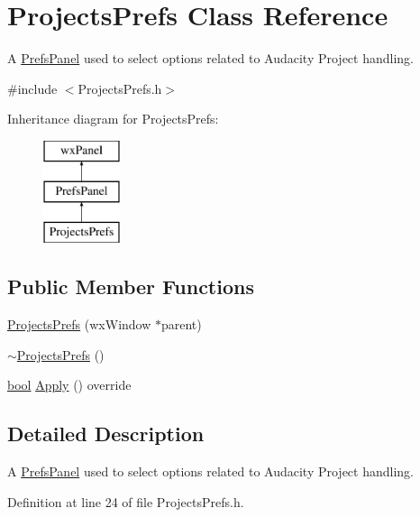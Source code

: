 \hypertarget{class_projects_prefs}{}\section{Projects\+Prefs Class Reference}
\label{class_projects_prefs}


A \hyperlink{class_prefs_panel}{Prefs\+Panel} used to select options related to Audacity Project handling.  




{\ttfamily \#include $<$Projects\+Prefs.\+h$>$}

Inheritance diagram for Projects\+Prefs\+:\begin{figure}[H]
\begin{center}
\leavevmode
\includegraphics[height=3.000000cm]{class_projects_prefs}
\end{center}
\end{figure}
\subsection*{Public Member Functions}
\begin{DoxyCompactItemize}
\item 
\hyperlink{class_projects_prefs_a78f7743b7a694cb9061f23af5c608077}{Projects\+Prefs} (wx\+Window $\ast$parent)
\item 
\hyperlink{class_projects_prefs_a9937feacbd688594625b16ccd4acec1e}{$\sim$\+Projects\+Prefs} ()
\item 
\hyperlink{mac_2config_2i386_2lib-src_2libsoxr_2soxr-config_8h_abb452686968e48b67397da5f97445f5b}{bool} \hyperlink{class_projects_prefs_ab8b448a1f6865abd62e4bb0762c4c7e5}{Apply} () override
\end{DoxyCompactItemize}


\subsection{Detailed Description}
A \hyperlink{class_prefs_panel}{Prefs\+Panel} used to select options related to Audacity Project handling. 

Definition at line 24 of file Projects\+Prefs.\+h.



